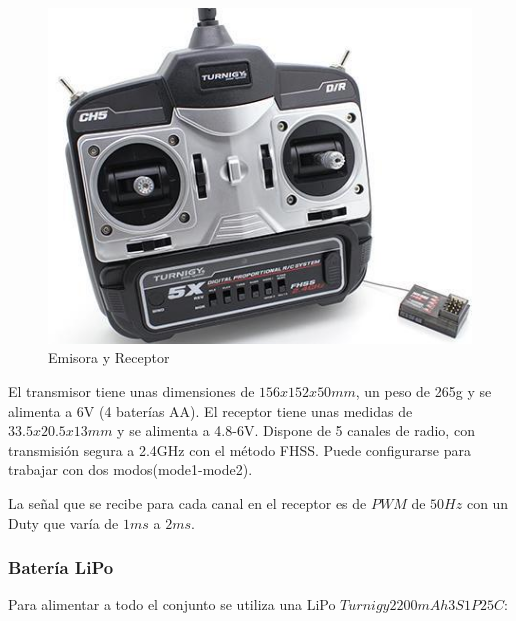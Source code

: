 \documentclass[twoside,11pt]{book}
\begin{document}
\begin{figure}[h!]
\begin{center}
\includegraphics[scale=0.4,bb=0 0 400 354]{images/E_R.png} 
\caption{Emisora y Receptor}
\end{center}
\end{figure}

El transmisor tiene unas dimensiones de $156x152x50mm$, un peso de 265g y se alimenta a 6V (4 baterías AA). El receptor tiene unas medidas de $33.5x20.5x13mm$ y se alimenta a 4.8-6V. Dispone de 5 canales de radio, con transmisión segura a 2.4GHz con el método FHSS. Puede configurarse para trabajar con dos modos(mode1-mode2).

La señal que se recibe para cada canal en el receptor es de $PWM$ de $50Hz$ con un Duty que varía de $1ms$ a $2ms$.


\subsubsection*{Batería LiPo}
Para alimentar a todo el conjunto se utiliza una LiPo $Turnigy 2200mAh 3S1P 25C$: 
\end{document}

